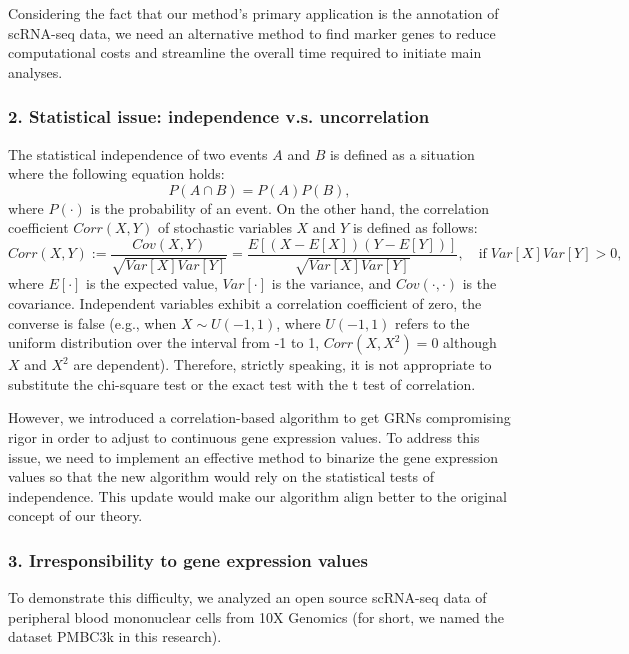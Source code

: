 \documentclass{article}
\begin{document}
Considering the fact that 
our method's primary application is the annotation of scRNA-seq data, 
we need an alternative method to find marker genes to reduce computational costs and 
streamline the overall time required to initiate main analyses.

\subsubsection*{2. Statistical issue: independence v.s. uncorrelation}
The statistical independence of two events $A$ and $B$ is defined as a situation where the following equation holds:
\begin{equation}\label{independence}
  P(A\cap B)=P(A)P(B),
\end{equation}
where $P(\cdot)$ is the probability of an event. On the other hand, the correlation coefficient $Corr(X, Y)$ of stochastic variables 
$X$ and $Y$ is defined as follows:
\begin{equation}\label{corr}
  Corr(X, Y):=\frac{Cov(X, Y)}{\sqrt{Var[X]Var[Y]}}=\frac{E[(X-E[X])(Y-E[Y])]}{\sqrt{Var[X]Var[Y]}},\quad \text{if}\; Var[X]Var[Y] > 0,
\end{equation}
where $E[\cdot]$ is the expected value, $Var[\cdot]$ is the variance, and $Cov(\cdot, \cdot)$ is the covariance. Independent variables 
exhibit a correlation coefficient of zero, the converse is false (e.g., when $X\sim U(-1, 1)$, where $U(-1, 1)$ refers to the uniform 
distribution over the interval from -1 to 1, $Corr(X, X^2)=0$ although $X$ and $X^2$ are dependent). Therefore, strictly 
speaking, it is not appropriate to substitute the chi-square test or the exact test with the t test of correlation.

However, we introduced a correlation-based algorithm to get GRNs compromising rigor in order to adjust to 
continuous gene expression values. To address this issue, we need to implement an effective method to binarize the 
gene expression values so that the new algorithm would rely on the statistical tests of independence. This update 
would make our algorithm align better to the original concept of our theory.

\subsubsection*{3. Irresponsibility to gene expression values}
To demonstrate this difficulty, we analyzed an open source scRNA-seq data of peripheral blood mononuclear 
cells from 10X Genomics (for short, we named the dataset PMBC3k in this research).
\end{document}
